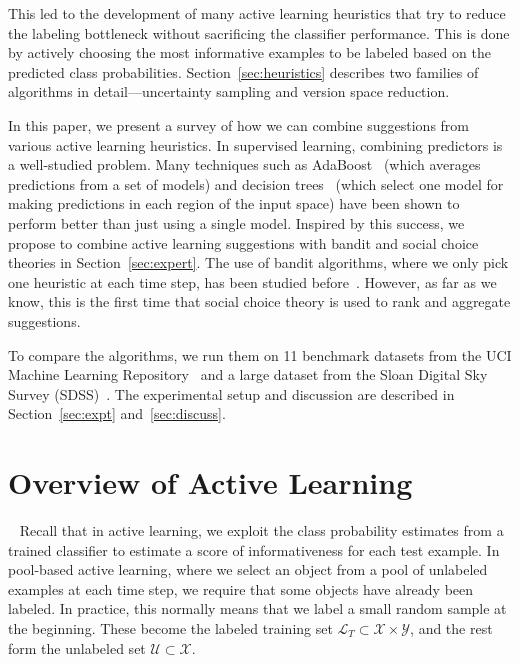 \documentclass[fleqn,10pt,lineno]{wlpeerj} %
\newcommand{\X}{\mathcal{X}}
\newcommand{\Y}{\mathcal{Y}}
\newcommand{\Unlabeled}{\mathcal{U}}
\newcommand{\Labeled}{\mathcal{L}}
\begin{document}
This led to the development of many active learning heuristics that try to
reduce the labeling bottleneck without sacrificing the classifier performance.
This is done by actively choosing the most informative examples to be labeled
based on the predicted class probabilities. Section~\ref{sec:heuristics}
describes two families of algorithms in detail---uncertainty sampling and
version space reduction.

In this paper, we present a survey of how we can combine suggestions from
various active learning heuristics. In supervised learning, combining
predictors is a well-studied problem. Many techniques such as
AdaBoost~\citep{freund96} (which averages predictions from a set of models) and
decision trees~\citep{breiman84} (which select one model for making predictions
in each region of the input space) have been shown to perform better than just
using a single model. Inspired by this success, we propose to combine active
learning suggestions with bandit and social choice theories in
Section~\ref{sec:expert}. The use of bandit algorithms, where we only pick one
heuristic at each time step, has been studied before~\citep{baram04, hsu15}.
However, as far as we know, this is the first time that social choice theory is
used to rank and aggregate suggestions.

To compare the algorithms, we run them on 11 benchmark datasets from the UCI
Machine Learning Repository~\citep{lichman13} and a large dataset from the
Sloan Digital Sky Survey (SDSS)~\citep{alam15}. The experimental setup and
discussion are described in Section~\ref{sec:expt} and~\ref{sec:discuss}.


\section{Overview of Active Learning}~\label{sec:heuristics}
Recall that in active learning, we exploit the class probability estimates from
a trained classifier to estimate a score of informativeness for each test
example. In pool-based active learning, where we select an object from a pool
of unlabeled examples at each time step, we require that some objects have
already been labeled. In practice, this normally means that we label a small
random sample at the beginning. These become the labeled training set
$\Labeled_T \subset \X \times \Y$, and the rest form the unlabeled set
$\Unlabeled \subset \X$.
\end{document}
